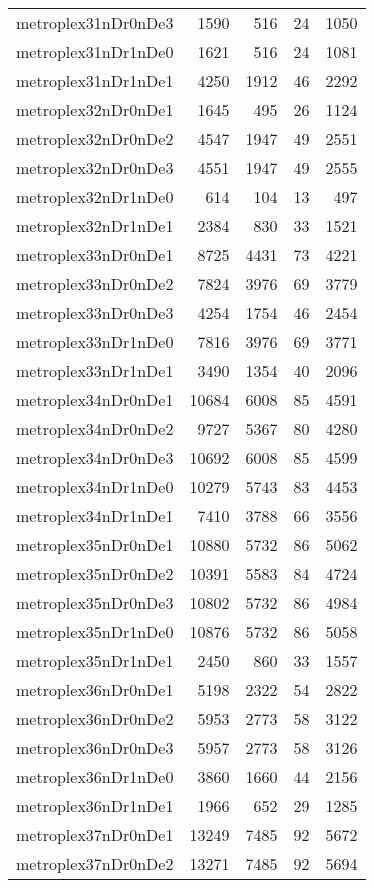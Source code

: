 \begin{longtable}{lrrrr}
metroplex31nDr0nDe3 & 1590 & 516 & 24 & 1050 \\
metroplex31nDr1nDe0 & 1621 & 516 & 24 & 1081 \\
metroplex31nDr1nDe1 & 4250 & 1912 & 46 & 2292 \\
metroplex32nDr0nDe1 & 1645 & 495 & 26 & 1124 \\
metroplex32nDr0nDe2 & 4547 & 1947 & 49 & 2551 \\
metroplex32nDr0nDe3 & 4551 & 1947 & 49 & 2555 \\
metroplex32nDr1nDe0 & 614 & 104 & 13 & 497 \\
metroplex32nDr1nDe1 & 2384 & 830 & 33 & 1521 \\
metroplex33nDr0nDe1 & 8725 & 4431 & 73 & 4221 \\
metroplex33nDr0nDe2 & 7824 & 3976 & 69 & 3779 \\
metroplex33nDr0nDe3 & 4254 & 1754 & 46 & 2454 \\
metroplex33nDr1nDe0 & 7816 & 3976 & 69 & 3771 \\
metroplex33nDr1nDe1 & 3490 & 1354 & 40 & 2096 \\
metroplex34nDr0nDe1 & 10684 & 6008 & 85 & 4591 \\
metroplex34nDr0nDe2 & 9727 & 5367 & 80 & 4280 \\
metroplex34nDr0nDe3 & 10692 & 6008 & 85 & 4599 \\
metroplex34nDr1nDe0 & 10279 & 5743 & 83 & 4453 \\
metroplex34nDr1nDe1 & 7410 & 3788 & 66 & 3556 \\
metroplex35nDr0nDe1 & 10880 & 5732 & 86 & 5062 \\
metroplex35nDr0nDe2 & 10391 & 5583 & 84 & 4724 \\
metroplex35nDr0nDe3 & 10802 & 5732 & 86 & 4984 \\
metroplex35nDr1nDe0 & 10876 & 5732 & 86 & 5058 \\
metroplex35nDr1nDe1 & 2450 & 860 & 33 & 1557 \\
metroplex36nDr0nDe1 & 5198 & 2322 & 54 & 2822 \\
metroplex36nDr0nDe2 & 5953 & 2773 & 58 & 3122 \\
metroplex36nDr0nDe3 & 5957 & 2773 & 58 & 3126 \\
metroplex36nDr1nDe0 & 3860 & 1660 & 44 & 2156 \\
metroplex36nDr1nDe1 & 1966 & 652 & 29 & 1285 \\
metroplex37nDr0nDe1 & 13249 & 7485 & 92 & 5672 \\
metroplex37nDr0nDe2 & 13271 & 7485 & 92 & 5694 \\

\end{longtable}
